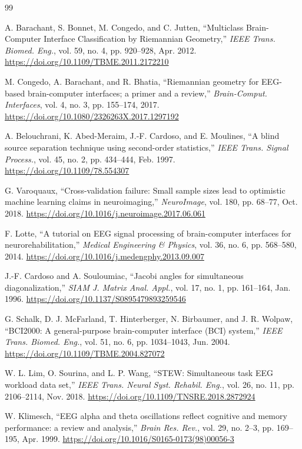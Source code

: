 \documentclass[11pt]{article}
\begin{document}
\begin{thebibliography}{99}

 A. Barachant, S. Bonnet, M. Congedo, and C. Jutten, ``Multiclass Brain-Computer Interface Classification by Riemannian Geometry,'' \emph{IEEE Trans. Biomed. Eng.}, vol. 59, no. 4, pp. 920--928, Apr. 2012. \url{https://doi.org/10.1109/TBME.2011.2172210}

 M. Congedo, A. Barachant, and R. Bhatia, ``Riemannian geometry for EEG-based brain-computer interfaces; a primer and a review,'' \emph{Brain-Comput. Interfaces}, vol. 4, no. 3, pp. 155--174, 2017. \url{https://doi.org/10.1080/2326263X.2017.1297192}

 A. Belouchrani, K. Abed-Meraim, J.-F. Cardoso, and E. Moulines, ``A blind source separation technique using second-order statistics,'' \emph{IEEE Trans. Signal Process.}, vol. 45, no. 2, pp. 434--444, Feb. 1997. \url{https://doi.org/10.1109/78.554307}

 G. Varoquaux, ``Cross-validation failure: Small sample sizes lead to optimistic machine learning claims in neuroimaging,'' \emph{NeuroImage}, vol. 180, pp. 68--77, Oct. 2018. \url{https://doi.org/10.1016/j.neuroimage.2017.06.061}

 F. Lotte, ``A tutorial on EEG signal processing of brain-computer interfaces for neurorehabilitation,'' \emph{Medical Engineering \& Physics}, vol. 36, no. 6, pp. 568--580, 2014. \url{https://doi.org/10.1016/j.medengphy.2013.09.007}

 J.-F. Cardoso and A. Souloumiac, ``Jacobi angles for simultaneous diagonalization,'' \emph{SIAM J. Matrix Anal. Appl.}, vol. 17, no. 1, pp. 161--164, Jan. 1996. \url{https://doi.org/10.1137/S0895479893259546}

 G. Schalk, D. J. McFarland, T. Hinterberger, N. Birbaumer, and J. R. Wolpaw, ``BCI2000: A general-purpose brain-computer interface (BCI) system,'' \emph{IEEE Trans. Biomed. Eng.}, vol. 51, no. 6, pp. 1034--1043, Jun. 2004. \url{https://doi.org/10.1109/TBME.2004.827072}

 W. L. Lim, O. Sourina, and L. P. Wang, ``STEW: Simultaneous task EEG workload data set,'' \emph{IEEE Trans. Neural Syst. Rehabil. Eng.}, vol. 26, no. 11, pp. 2106--2114, Nov. 2018. \url{https://doi.org/10.1109/TNSRE.2018.2872924}

 W. Klimesch, ``EEG alpha and theta oscillations reflect cognitive and memory performance: a review and analysis,'' \emph{Brain Res. Rev.}, vol. 29, no. 2--3, pp. 169--195, Apr. 1999. \url{https://doi.org/10.1016/S0165-0173(98)00056-3}


\end{thebibliography}
\end{document}
